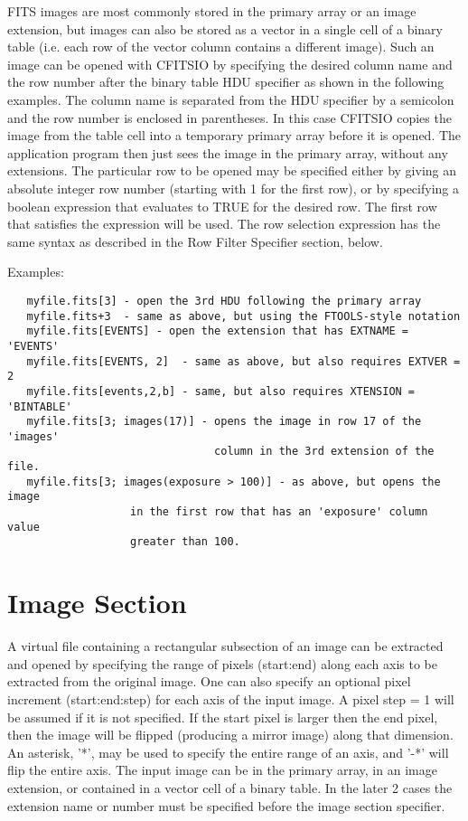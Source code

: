 \documentclass[11pt]{book}
\begin{document}
FITS images are most commonly stored in the primary array or an image
extension, but images can also be stored as a vector in a single cell
of a binary table (i.e. each row of the vector column contains a
different image).  Such an image can be opened with CFITSIO by
specifying the desired column  name and the row number after the binary
table HDU specifier as shown in the following examples. The column name
is separated from the HDU specifier by a semicolon and the row number
is enclosed in parentheses.  In this case CFITSIO copies the image from
the table cell into a temporary primary array before it is opened.  The
application program then just sees the image in the primary array,
without any extensions.  The particular row to be opened may be
specified either by giving an absolute integer row number (starting
with 1 for the first row), or by specifying a boolean expression that
evaluates to TRUE for the desired row.  The first row that satisfies
the expression will be used.  The row selection expression has the same
syntax as described in the Row Filter Specifier section, below.

 Examples:

\begin{verbatim}
   myfile.fits[3] - open the 3rd HDU following the primary array
   myfile.fits+3  - same as above, but using the FTOOLS-style notation
   myfile.fits[EVENTS] - open the extension that has EXTNAME = 'EVENTS'
   myfile.fits[EVENTS, 2]  - same as above, but also requires EXTVER = 2
   myfile.fits[events,2,b] - same, but also requires XTENSION = 'BINTABLE'
   myfile.fits[3; images(17)] - opens the image in row 17 of the 'images'
                                column in the 3rd extension of the file.
   myfile.fits[3; images(exposure > 100)] - as above, but opens the image
                   in the first row that has an 'exposure' column value
                   greater than 100.
\end{verbatim}


\section{Image Section}

A virtual file containing a rectangular subsection of an image can be
extracted and opened by specifying the range of pixels (start:end)
along each axis to be extracted from the original image.  One can also
specify an optional pixel increment (start:end:step) for each axis of
the input image.  A pixel step = 1 will be assumed if it is not
specified.  If the start pixel is larger then the end pixel, then the
image will be flipped (producing a mirror image) along that dimension.
An asterisk, '*', may be used to specify the entire range of an axis,
and '-*' will flip the entire axis. The input image can be in the
primary array, in an image extension, or contained in a vector cell of
a binary table. In the later 2 cases the extension name or number must
be specified before the image section specifier.
\end{document}
